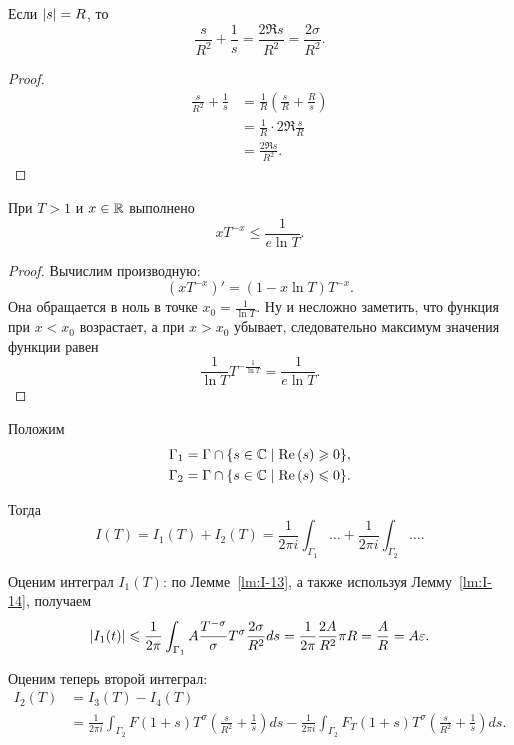 \begin{nlemma}
\label{lm:I-14}
    Если $\left| s \right| = R$, то
    \[
        \frac{s}{R^2} + \frac{1}{s} = \frac{2\Re{s}}{R^2} = \frac{2\sigma}{R^2}.
    \]
\end{nlemma}
\begin{proof}
    \begin{align*}
        \frac{s}{R^2} + \frac{1}{s} 
        &= \frac{1}{R} \left( \frac{s}{R} + \frac{R}{s} \right) \\
        &= \frac{1}{R} \cdot 2\Re{\frac{s}{R}} \\
        &= \frac{2\Re{s}}{R^2}.
    \end{align*}
\end{proof}

\begin{nlemma}
\label{lm:I-15}
    При $T > 1$ и $x \in \mathbb{R}$ выполнено 
    \[
        xT^{-x} \le \frac{1}{e\ln{T}}.
    \]
\end{nlemma}
\begin{proof}
    Вычислим производную:
    \[
       (xT^{-x})' = (1 - x\ln{T})T^{-x}.
    \]
    Она обращается в ноль в точке $x_{0} = \frac{1}{\ln{T}}$. Ну и несложно заметить, что функция при $x < x_0$ возрастает, а при $x > x_0$ убывает, следовательно максимум значения функции равен 
    \[
        \frac{1}{\ln{T}} T^{-\frac{1}{\ln{T}}} = \frac{1}{e\ln{T}}.
    \]
\end{proof}

Положим
\begin{align*}
    \Gamma_1 &= \Gamma \cap \{ s \in \mathbb{C} \mid \operatorname{Re}\left( s \right) \geqslant 0 \}, \\
    \Gamma_2 &= \Gamma \cap \{ s \in \mathbb{C} \mid \operatorname{Re}\left( s \right) \leqslant 0 \}.
\end{align*}

Тогда 
\[
    I(T) = I_1(T) + I_2(T) 
         = \frac{1}{2\pi i} \int_{\Gamma_1} \dots + 
           \frac{1}{2\pi i} \int_{\Gamma_2} \dots .
\]

Оценим интеграл $I_1(T)$: по Лемме~\ref{lm:I-13}, а также используя Лемму~\ref{lm:I-14}, получаем
\[
    \left| I_1(t) \right| \leqslant \frac{1}{2\pi} \int_{\Gamma_1} A\frac{T^{-\sigma}}{\sigma} T^{\sigma} \frac{2\sigma}{R^2}ds = \frac{1}{2\pi} \frac{2A}{R^2} \pi R = \frac{A}{R} = A\varepsilon.
\]

Оценим теперь второй интеграл:
\begin{align*}
    I_2(T) &= I_3(T) - I_4(T) \\
    &= \frac{1}{2\pi i} \int_{\Gamma_2} F(1+s)T^{\sigma} \left( \frac{s}{R^2} + \frac{1}{s} \right)ds 
    - \frac{1}{2\pi i} \int_{\Gamma_2} F_T(1+s)T^{\sigma} \left( \frac{s}{R^2} + \frac{1}{s} \right)ds.
\end{align*}

